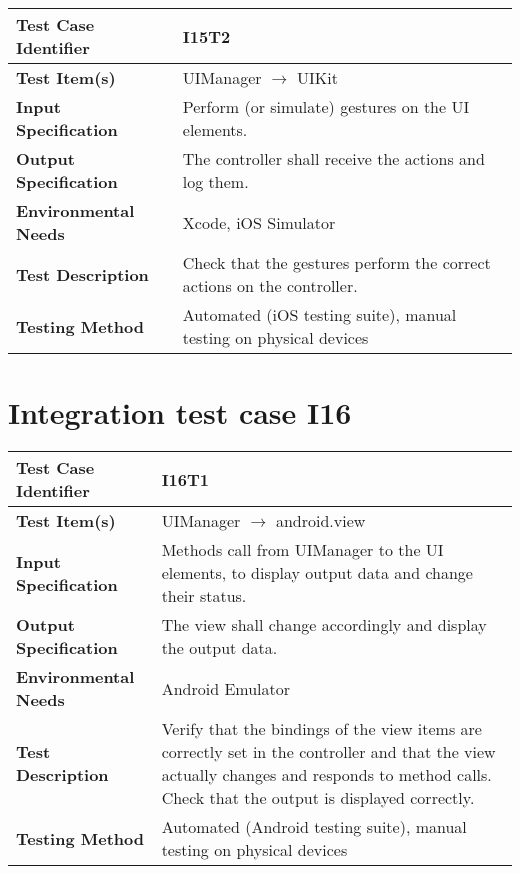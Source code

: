 \vspace{2em}

\noindent\begin{tabular}{l p{}}
    \hline
    \textbf{Test Case Identifier} & I15T2\\
    \hline
    \textbf{Test Item(s)} & UIManager $\rightarrow$ UIKit \\
    \hline
    \textbf{Input Specification} & Perform (or simulate) gestures on the UI elements.\\
    \hline
    \textbf{Output Specification} & The controller shall receive the actions and log them. \\
    \hline
    \textbf{Environmental Needs} & Xcode, iOS Simulator\\
    \hline
    \textbf{Test Description} & Check that the gestures perform the correct actions on the controller.\\
    \hline
    \textbf{Testing Method} & Automated (iOS testing suite), manual testing on physical devices \\
    \hline
\end{tabular}

\vspace{2em}

\section{Integration test case I16}

\begin{tabular}{l p{}}
    \hline
    \textbf{Test Case Identifier} & I16T1\\
    \hline
    \textbf{Test Item(s)} & UIManager $\rightarrow$ android.view \\
    \hline
    \textbf{Input Specification} & Methods call from UIManager to the UI elements, to display output data and change their status.\\
    \hline
    \textbf{Output Specification} & The view shall change accordingly and display the output data.\\
    \hline
    \textbf{Environmental Needs} & Android Emulator \\
    \hline
    \textbf{Test Description} & Verify that the bindings of the view items are correctly set in the controller and that the view actually changes and responds to method calls. Check that the output is displayed correctly.\\
    \hline
    \textbf{Testing Method} & Automated (Android testing suite), manual testing on physical devices \\
    \hline
\end{tabular}

